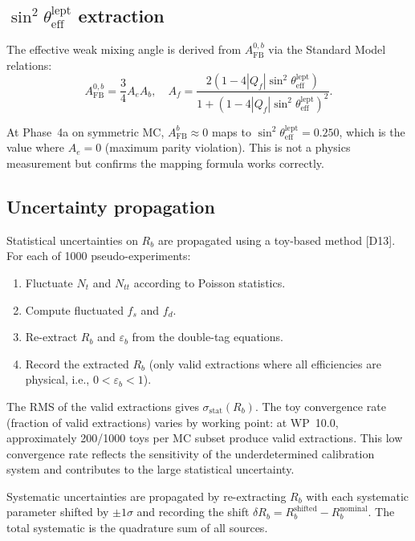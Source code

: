 \documentclass[11pt,a4paper]{article}
\begin{document}
\subsection{$\sin^2\theta_\mathrm{eff}^\mathrm{lept}$ extraction}
\label{sec:stat_sin2theta}

The effective weak mixing angle is derived from $A_\mathrm{FB}^{0,b}$ via the Standard
Model relations:
\begin{equation}
A_\mathrm{FB}^{0,b} = \frac{3}{4} A_e A_b, \quad
A_f = \frac{2(1 - 4|Q_f|\sin^2\theta_\mathrm{eff}^\mathrm{lept})}{1 + (1 - 4|Q_f|\sin^2\theta_\mathrm{eff}^\mathrm{lept})^2}.
\label{eq:sin2theta}
\end{equation}

At Phase~4a on symmetric MC, $A_\mathrm{FB}^b \approx 0$ maps to
$\sin^2\theta_\mathrm{eff}^\mathrm{lept} = 0.250$, which is the value where $A_e = 0$
(maximum parity violation). This is not a physics measurement but confirms the
mapping formula works correctly.

\subsection{Uncertainty propagation}
\label{sec:uncertainty_propagation}

Statistical uncertainties on $R_b$ are propagated using a toy-based method [D13].
For each of 1000 pseudo-experiments:
\begin{enumerate}
\item Fluctuate $N_t$ and $N_{tt}$ according to Poisson statistics.
\item Compute fluctuated $f_s$ and $f_d$.
\item Re-extract $R_b$ and $\varepsilon_b$ from the double-tag equations.
\item Record the extracted $R_b$ (only valid extractions where all efficiencies
are physical, i.e., $0 < \varepsilon_b < 1$).
\end{enumerate}
The RMS of the valid extractions gives $\sigma_\mathrm{stat}(R_b)$. The toy
convergence rate (fraction of valid extractions) varies by working point:
at WP~10.0, approximately 200/1000 toys per MC subset produce valid extractions.
This low convergence rate reflects the sensitivity of the underdetermined
calibration system and contributes to the large statistical uncertainty.

Systematic uncertainties are propagated by re-extracting $R_b$ with each
systematic parameter shifted by $\pm 1\sigma$ and recording the shift
$\delta R_b = R_b^\mathrm{shifted} - R_b^\mathrm{nominal}$. The total
systematic is the quadrature sum of all sources.
\end{document}

